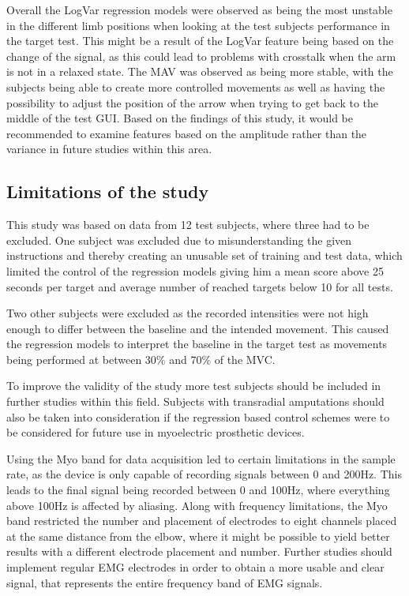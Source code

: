 	Overall the LogVar regression models were observed as being the most unstable in the different limb positions when looking at the test subjects performance in the target test. This might be a result of the LogVar feature being based on the change of the signal, as this could lead to problems with crosstalk when the arm is not in a relaxed state. The MAV was observed as being more stable, with the subjects being able to create more controlled movements as well as having the possibility to adjust the position of the arrow when trying to get back to the middle of the test GUI. Based on the findings of this study, it would be recommended to examine features based on the amplitude rather than the variance in future studies within this area.
	
	\subsection{Limitations of the study}
	This study was based on data from 12 test subjects, where three had to be excluded. One subject was excluded due to misunderstanding the given instructions and thereby creating an unusable set of training and test data, which limited the control of the regression models giving him a mean score above 25 seconds per target and average number of reached targets below 10 for all tests.
	
	Two other subjects were excluded as the recorded intensities were not high enough to differ between the baseline and the intended movement. This caused the regression models to interpret the baseline in the target test as movements being performed at between 30\% and 70\% of the MVC.
	
	To improve the validity of the study more test subjects should be included in further studies within this field. Subjects with transradial amputations should also be taken into consideration if the regression based control schemes were to be considered for future use in myoelectric prosthetic devices. 
	
	Using the Myo band for data acquisition led to certain limitations in the sample rate, as the device is only capable of recording signals between 0 and 200Hz. This leads to the final signal being recorded between 0 and 100Hz, where everything above 100Hz is affected by aliasing. Along with frequency limitations, the Myo band restricted the number and placement of electrodes to eight channels placed at the same distance from the elbow, where it might be possible to yield better results with a different electrode placement and number. Further studies should implement regular EMG electrodes in order to obtain a more usable and clear signal, that represents the entire frequency band of EMG signals.
	

